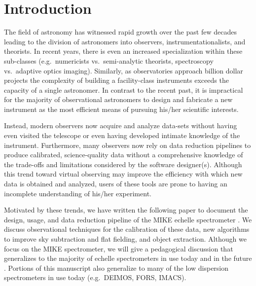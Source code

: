 \documentclass[]{emulateapj}
\begin{document}
\section{Introduction}

The field of astronomy has witnessed rapid growth over
the past few decades leading to the division of astronomers 
into observers, instrumentationalists, and theorists.  
In recent years, there is even an increased specialization 
within these sub-classes (e.g.\ numericists vs.\ semi-analytic theorists,
spectroscopy vs.\ adaptive optics imaging).
Similarly, as observatories approach billion dollar projects
the complexity of building a facility-class instruments 
exceeds the capacity of a single astronomer.
In contrast to the recent past, 
it is impractical for the majority of
observational astronomers to design and fabricate a new instrument
as the most efficient means of pursuing his/her scientific interests.  

Instead, modern observers now acquire and analyze
data-sets without having even visited the telescope or even having
developed intimate knowledge of the instrument.
Furthermore,  many observers now rely on data reduction pipelines
to produce calibrated, science-quality data without a comprehensive
knowledge of the trade-offs and limitations considered by the
software designer(s).  Although this trend toward virtual observing
may improve the efficiency with which new data is obtained
and analyzed, 
users of these tools are prone to having an incomplete
understanding of his/her experiment.

Motivated by these trends, we have written the following
paper to document the design, usage, and data reduction pipeline
of the MIKE echelle spectrometer \citep{mike}.  
We discuss observational techniques for the calibration
of these data, new algorithms to improve sky subtraction and
flat fielding, and object extraction.
Although we focus on the MIKE spectrometer, we will give 
a pedagogical discussion that generalizes to the majority of 
echelle spectrometers in use today and in the future
\citep[e.g.\ HIRES, UVES;][]{vogt94,uves}.
Portions of this manuscript also generalize to many of the low
dispersion spectrometers in use today (e.g.\ DEIMOS, FORS, IMACS).
\end{document}

